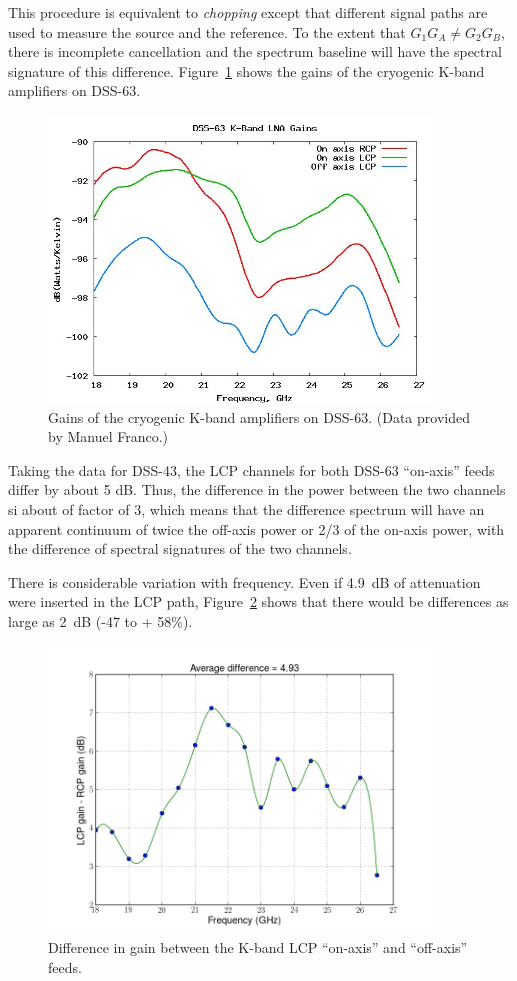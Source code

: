 \documentclass[a4paper,11pt]{article}
\begin{document}
This procedure is equivalent to {\it chopping} except that different signal
paths are used to measure the source and the reference.
To the extent that $G_1 G_A \ne G_2 G_B$, 
there is incomplete cancellation and the spectrum baseline will have the 
spectral signature of this difference.
Figure~\ref{fig:DSS63gains} shows the gains of the cryogenic K-band 
amplifiers on DSS-63.
\begin{figure}[h!tb]
  \begin{center}
    \includegraphics[width=4in]{DSS-63_gains.jpg}
    \caption{\label{fig:DSS63gains}Gains of the cryogenic K-band amplifiers
    on DSS-63. (Data provided by Manuel Franco.)}
  \end{center}
\end{figure}
Taking the data for DSS-43, the LCP channels for both DSS-63 ``on-axis''
feeds differ by about 5 dB.  Thus, the difference in the power between the 
two channels si about of factor of 3, which means that the difference
spectrum will have an apparent continuum of twice the off-axis power or
2/3 of the on-axis power, with the difference of spectral signatures of the
two channels.

There is considerable variation with frequency.  Even if 4.9~dB of attenuation
were inserted in the LCP path, Figure~\ref{fig:gain-diff} shows that there 
would be differences as large as 2~dB (-47 to + 58\%).
\begin{figure}[h!tb]
  \begin{center}
    \includegraphics[width=4in]{gain_diff.png}
    \caption{\label{fig:gain-diff}Difference in gain between the K-band LCP
    ``on-axis'' and ``off-axis'' feeds.}
  \end{center}
\end{figure}
\end{document}

